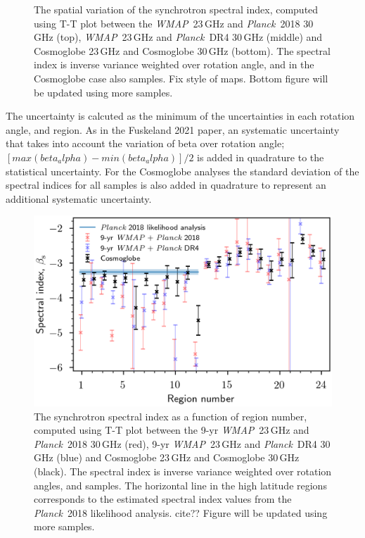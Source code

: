 \documentclass[twocolumn]{../../common/aa}
\def\WMAP{\emph{WMAP}}
\def\Planck{\emph{Planck}}
\newcommand{\red}[0]{\color{red}}
\begin{document}
\begin{figure}
        \caption{The spatial variation of the synchrotron spectral index, computed using T-T plot between the \WMAP\ 23\,GHz and \Planck\ 2018 30\,GHz (top), \WMAP\ 23\,GHz and \Planck\ DR4 30\,GHz (middle) and Cosmoglobe 23\,GHz and Cosmoglobe 30\,GHz (bottom). The spectral index is inverse variance weighted over rotation angle, and in the Cosmoglobe case also samples. {\red Fix style of maps. Bottom figure will be updated using more samples.}}
        \label{fig:cos20_beta_map}
\end{figure}

The uncertainty is calcuted as the minimum of the uncertainties in each rotation angle, and region. As in the Fuskeland 2021 paper, an systematic uncertainty that takes into account the variation of beta over rotation angle; $[ max(beta_alpha) - min(beta_alpha) ] /2$ is added in quadrature to the statistical uncertainty.
For the Cosmoglobe analyses the standard deviation of the spectral indices for all samples is also added in quadrature to represent an additional systematic uncertainty.

\begin{figure}
        \centering
        \includegraphics[width=\linewidth]{figures/cos30_region_beta_cosmoglobe_vs_wmap.png}
        \caption{The synchrotron spectral index as a function of region number, computed using T-T plot between the 9-yr \WMAP\ 23\,GHz and \Planck\ 2018 30\,GHz (red), 9-yr \WMAP\ 23\,GHz and \Planck\ DR4 30\,GHz (blue) and Cosmoglobe 23\,GHz and Cosmoglobe 30\,GHz (black). The spectral index is inverse variance weighted over rotation angles, and samples. The horizontal line in the high latitude regions corresponds to the estimated spectral index values from the \Planck\ 2018 likelihood analysis. cite?? {\red Figure will be updated using more samples.}}
        \label{fig:cos30_beta_region}
\end{figure}
\end{document}
